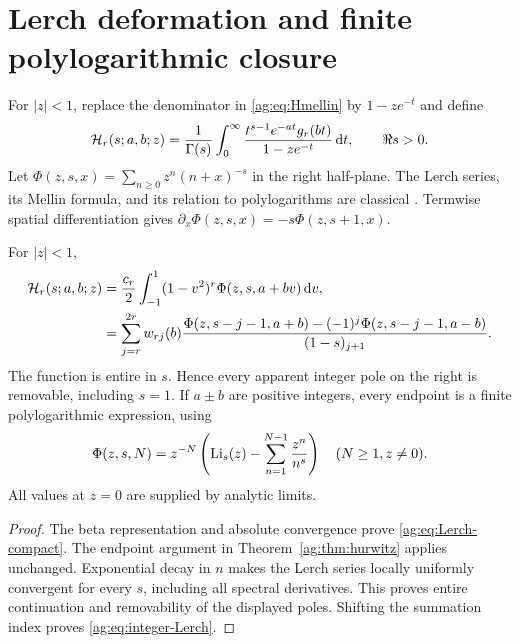 \section{Lerch deformation and finite polylogarithmic closure}
\label{ag:sec:polylogs}

For $|z|<1$, replace the denominator in \eqref{ag:eq:Hmellin} by
$1-ze^{-t}$ and define
\begin{equation}\label{ag:eq:Lerch-transform}
 \mathcal H_r(s;a,b;z)=\frac1{\Gamma(s)}\int_0^\infty
             \frac{t^{s-1}e^{-at}g_r(bt)}{1-ze^{-t}}\,\mathrm d t,
                     \qquad\Re s>0.
\end{equation}
Let $\Phi(z,s,x)=\sum_{n\ge0}z^n(n+x)^{-s}$ in the right half-plane.
The Lerch series, its Mellin formula, and its relation to polylogarithms
are classical \cite{DLMFlerch}. Termwise spatial differentiation gives
$\partial_x\Phi(z,s,x)=-s\Phi(z,s+1,x)$.

\begin{theorem}\label{ag:thm:Lerch}
For $|z|<1$,
\begin{align}
 \mathcal H_r(s;a,b;z)&=\frac{c_r}{2}\int_{-1}^1
                       (1-v^2)^r\Phi(z,s,a+bv)\,\mathrm d v,
                       \label{ag:eq:Lerch-compact}\\
 &=\sum_{j=r}^{2r}w_{rj}(b)
 \frac{\Phi(z,s-j-1,a+b)-(-1)^j\Phi(z,s-j-1,a-b)}{(1-s)_{j+1}}.
                       \label{ag:eq:Lerch-endpoint}
\end{align}
The function is entire in $s$. Hence every apparent integer pole on
the right is removable, including $s=1$.
If $a\pm b$ are positive integers, every endpoint is a finite
polylogarithmic expression, using
\begin{equation}\label{ag:eq:integer-Lerch}
 \Phi(z,s,N)=z^{-N}\left(\operatorname{Li}_s(z)-\sum_{n=1}^{N-1}\frac{z^n}{n^s}\right)
 \quad(N\ge1,
 z\ne0).
\end{equation}
All values at $z=0$ are supplied by analytic limits.
\end{theorem}
\begin{proof}
The beta representation and absolute convergence prove
\eqref{ag:eq:Lerch-compact}. The endpoint argument in
Theorem~\ref{ag:thm:hurwitz} applies unchanged. Exponential decay in
$n$ makes the Lerch series locally uniformly convergent for every
$s$, including all spectral derivatives. This proves entire continuation
and removability of the displayed poles. Shifting the summation index
proves \eqref{ag:eq:integer-Lerch}.
\end{proof}

